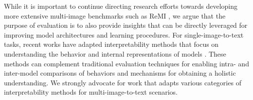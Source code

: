 While it is important to continue directing research efforts towards developing more extensive multi-image benchmarks such as ReMI \cite{rd_eval3}, we argue that the purpose of evaluation is to also provide insights that can be directly leveraged for improving model architectures and learning procedures. For single-image-to-text tasks, recent works have adapted interpretability methods that focus on understanding the behavior and internal representations of models \cite{rd_eval4,rd_eval5}. These methods can complement traditional evaluation techniques for enabling intra- and inter-model comparisons of behaviors and mechanisms for obtaining a holistic understanding. We strongly advocate for work that adapts various categories of interpretability methods for multi-image-to-text scenarios.